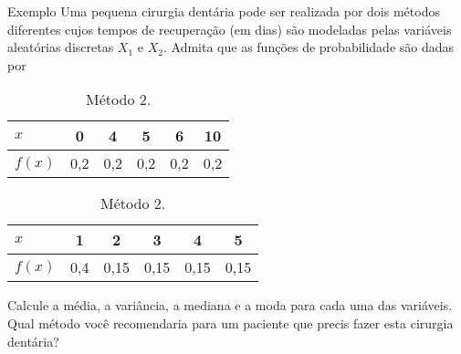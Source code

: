 \documentclass[9pt]{beamer}
\begin{document}
\begin{frame}{Exemplo}
 Uma pequena cirurgia dentária pode ser realizada por dois métodos diferentes cujos tempos de recuperação (em dias) são modeladas pelas variáveis aleatórias discretas $X_1$ e $X_2$. Admita que 
 as funções de probabilidade são dadas por
 \begin{table}[!htb]
    \caption*{Funções de probabilidade.}
    \begin{minipage}{.5\linewidth}
      \centering
      {\scriptsize
	\begin{tabular}{l|c|c|c|c|c}
	  \toprule[0.025cm]
	$x$& 0 & 4 & 5 & 6 & 10 \\ 
	  \midrule[0.025cm]
	$f(x)$ & 0,2 & 0,2 & 0,2 & 0,2 & 0,2 \\ 
	  \bottomrule[0.025cm]
	\end{tabular}
      }
	\caption{Método 1.} 
    \end{minipage}%
    \begin{minipage}{.5\linewidth}
      \centering
      {\scriptsize
      \begin{tabular}{l|c|c|c|c|c}
	\toprule[0.025cm]
      $x$& 1 & 2 & 3 & 4 & 5 \\ 
	\midrule[0.025cm]
      $f(x)$ & 0,4 & 0,15 & 0,15 & 0,15 & 0,15 \\ 
	\bottomrule[0.025cm]
      \end{tabular}
      }
      \caption{Método 2.} 
    \end{minipage} 
\end{table}
Calcule a média, a variância, a mediana e a moda para cada uma das variáveis. Qual método você recomendaria para um paciente que precis fazer  esta cirurgia dentária?


\end{frame}
\end{document}
